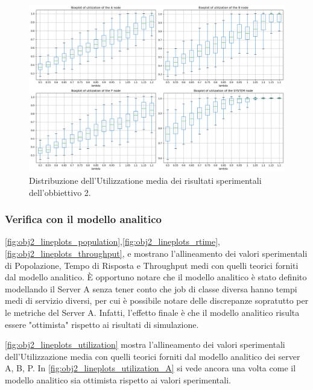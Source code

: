 \begin{figure}
    \centering
    \includegraphics[width=1\linewidth]{figs//results/obj2/simulation/obj2_boxplot_utilization.png}
    \caption{Distribuzione dell'Utilizzatione media dei risultati sperimentali dell'obbiettivo 2.}
    \label{fig:obj2_boxplot_utilization}
\end{figure}

\subsubsection{Verifica con il modello analitico}
\label{sec:results_obj2_verication}
\autoref{fig:obj2_lineplots_population},\autoref{fig:obj2_lineplots_rtime}, \autoref{fig:obj2_lineplots_throughput}, e  mostrano l'allineamento dei valori sperimentali di Popolazione, Tempo di Risposta e Throughput medi con quelli teorici forniti dal modello analitico. È opportuno notare che il modello analitico è stato definito modellando il Server A senza tener conto che job di classe diversa hanno tempi medi di servizio diversi, per cui è possibile notare delle discrepanze sopratutto per le metriche del Server A. Infatti, l'effetto finale è che il modello analitico risulta essere "ottimista" rispetto ai risultati di simulazione.

\autoref{fig:obj2_lineplots_utilization} mostra l'allineamento dei valori sperimentali \\dell'Utilizzazione media con quelli teorici forniti dal modello analitico dei server A, B, P. In \autoref{fig:obj2_lineplots_utilization_A} si vede ancora una volta come il modello analitico sia ottimista rispetto ai valori sperimentali.

